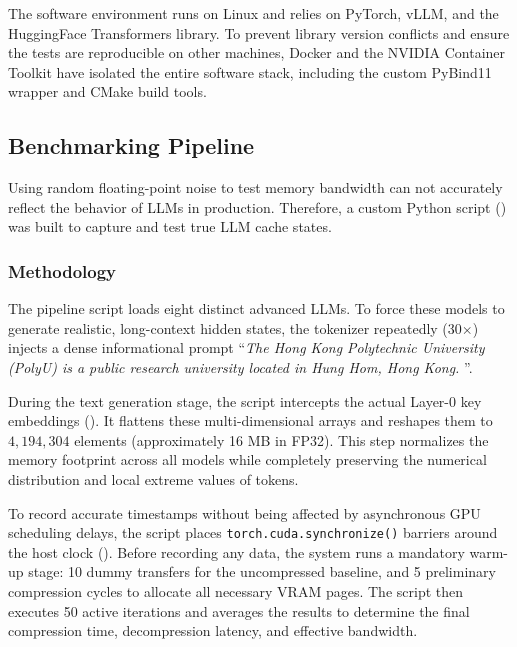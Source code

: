 \documentclass{polyu-comp}
\begin{document}
The software environment runs on Linux and relies on PyTorch, vLLM, and the HuggingFace Transformers \cite{wolf-etal-2020-transformers} library. To prevent library version conflicts and ensure the tests are reproducible on other machines, Docker and the NVIDIA Container Toolkit have isolated the entire software stack, including the custom PyBind11 wrapper and CMake build tools.

\subsection{Benchmarking Pipeline}
Using random floating-point noise to test memory bandwidth can not accurately reflect the behavior of LLMs in production. Therefore, a custom Python script () was built to capture and test true LLM cache states.

\subsubsection{Methodology}
The pipeline script loads eight distinct advanced LLMs. To force these models to generate realistic, long-context hidden states, the tokenizer repeatedly (30$\times$) injects a dense informational prompt ``\textit{The Hong Kong Polytechnic University (PolyU) is a public research university located in Hung Hom, Hong Kong. }''. 

During the text generation stage, the script intercepts the actual Layer-0 key embeddings (). It flattens these multi-dimensional arrays and reshapes them to $4,194,304$ elements (approximately 16 MB in FP32). This step normalizes the memory footprint across all models while completely preserving the numerical distribution and local extreme values of tokens.

To record accurate timestamps without being affected by asynchronous GPU scheduling delays, the script places \texttt{torch.cuda.synchronize()} barriers around the host clock (). Before recording any data, the system runs a mandatory warm-up stage: 10 dummy transfers for the uncompressed baseline, and 5 preliminary compression cycles to allocate all necessary VRAM pages. The script then executes 50 active iterations and averages the results to determine the final compression time, decompression latency, and effective bandwidth.
\end{document}
